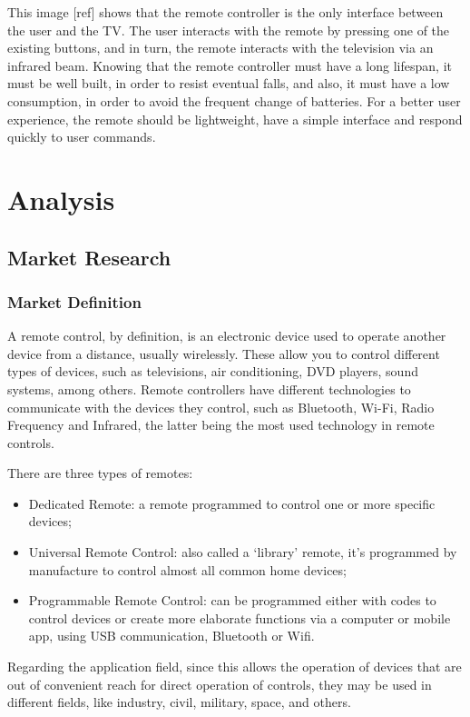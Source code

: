 \documentclass[12pt, letterpaper]{report}
\begin{document}
This image [ref] shows that the remote controller is the only interface between the user and the TV. The user interacts with the remote by pressing one of the existing buttons, and in turn, the remote interacts with the television via an infrared beam. Knowing that the remote controller must have a long lifespan, it must be well built, in order to resist eventual falls, and also, it must have a low consumption, in order to avoid the frequent change of batteries. For a better user experience, the remote should be lightweight, have a simple interface and respond quickly to user commands.

\chapter{Analysis}
\section{Market Research}
\subsection{Market Definition}
A remote control, by definition, is an electronic device used to operate another device from a distance, usually wirelessly. These allow you to control different types of devices, such as televisions, air conditioning, DVD players, sound systems, among others. Remote controllers have different technologies to communicate with the devices they control, such as Bluetooth, Wi-Fi, Radio Frequency and Infrared, the latter being the most used technology in remote controls.

There are three types of remotes:

\begin{itemize}
	\item Dedicated Remote: a remote programmed to control one or more 					specific devices; 

	\item Universal Remote Control: also called a ‘library’ remote, it’s 				programmed by manufacture to control almost all common home devices;

	\item Programmable Remote Control: can be programmed either with codes 				to control devices or create more elaborate functions via a 					computer or mobile app, using USB communication, Bluetooth or Wifi.
\end{itemize}

Regarding the application field, since this allows the operation of devices that are out of convenient reach for direct operation of controls, they may be used in different fields, like industry, civil, military, space, and others.
\end{document}
